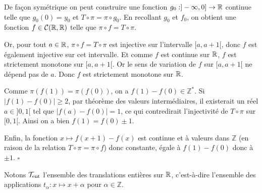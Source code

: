 	\par De façon symétrique on peut construire une fonction $g_0:]-\infty,0]\to {\mathbb{R}}$ continue telle que $g_0(0)=y_0$ et $T \circ \pi = \pi \circ g_0$. En recollant $g_0$ et $f_0$, on obtient une fonction $f \in \mathcal{C}({\mathbb{R}},{\mathbb{R}})$ telle que $\pi \circ f = T \circ \pi$.\\

	\par Or, pour tout $a \in {\mathbb{R}}$, $\pi\circ f=T\circ \pi$ est injective sur l'intervalle $[a,a+1[$, donc $f$ est également injective sur cet intervalle. Et comme $f$ est continue sur ${\mathbb{R}}$, $f$ est strictement monotone sur $[a,a+1[$. Or le sens de variation de $f$ sur $[a,a+1[$ ne dépend pas de $a$. Donc $f$ est strictement monotone sur ${\mathbb{R}}$.\\

	\par Comme $\pi(f(1))=\pi(f(0))$, on a $f(1)-f(0)\in \mathbb{Z}^*$. Si $|f(1)-f(0)| \geq 2$, par théorème des valeurs intermédiaires, il existerait un réel $a \in ]0,1[$ tel que $|f(a)-f(0)|=1$, ce qui contredirait l'injectivité de $T\circ\pi$ sur $[0,1[$. Ainsi on a bien $f(1)=f(0)\pm 1$. \\

	\par Enfin, la fonction $x\mapsto f(x+1)-f(x)$ est continue et à valeurs dans $\mathbb{Z}$ (en raison de la relation $T \circ \pi = \pi \circ f$) donc constante, égale à $f(1)-f(0)$ donc à $\pm 1$. \hfill $\square$\\


\begin{notation}
	Notons $\mathcal{T}_{\mathrm{ent}}$ l'ensemble des translations entières sur ${\mathbb{R}}$, c'est-à-dire l'ensemble des applications $t_\alpha: x \mapsto x + \alpha$ pour $\alpha \in \mathbb{Z}$.
\end{notation}
\vspace{8mm}











